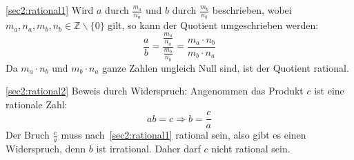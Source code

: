 \documentclass[10pt, a4paper, reqno]{amsart}
\makeatletter
\renewcommand\proofname{Beweis}
\renewenvironment{proof}[1][\proofname]{\par
\pushQED{\qed}%
\normalfont \topsep6\p@\@plus6\p@\relax
\trivlist
\item\relax
{\bfseries#1}\hspace\labelsep\ignorespaces
}{%
\popQED\endtrivlist\@endpefalse
}
\newenvironment{proof_thm}[1]{
\begin{proof}[\proofname~(#1)]}{\end{proof}}
\makeatother
\begin{document}
\begin{proof_thm}{\autoref{sec2:rational1}}
  Wird $a$ durch $\frac{m_a}{n_a}$ und $b$ durch
  $\frac{m_b}{n_b}$ beschrieben, wobei $m_a,n_a,m_b,n_b∈ℤ\backslash\{0\}$ gilt, so kann der Quotient
  umgeschrieben werden:
  \begin{equation*}
    \frac{a}{b} = \dfrac{\frac{m_a}{n_a}}{\frac{m_b}{n_b}}=\frac{m_a\cdot n_b}{m_b\cdot n_a}
  \end{equation*}
  Da $m_a\cdot n_b$ und $m_b\cdot n_a$ ganze Zahlen ungleich
  Null sind, ist der Quotient rational.
\end{proof_thm}
\begin{proof_thm}{\autoref{sec2:rational2}}
  Beweis durch Widerspruch: Angenommen das Produkt $c$ ist eine rationale Zahl:
  \begin{equation*}
    ab=c \Rightarrow b =\frac{c}{a}
  \end{equation*}
  Der Bruch $\frac{c}{a}$ muss nach~\autoref{sec2:rational1} rational sein, also
  gibt es einen Widerspruch, denn $b$ ist irrational. Daher darf $c$ nicht
  rational sein.
\end{proof_thm}
\end{document}
